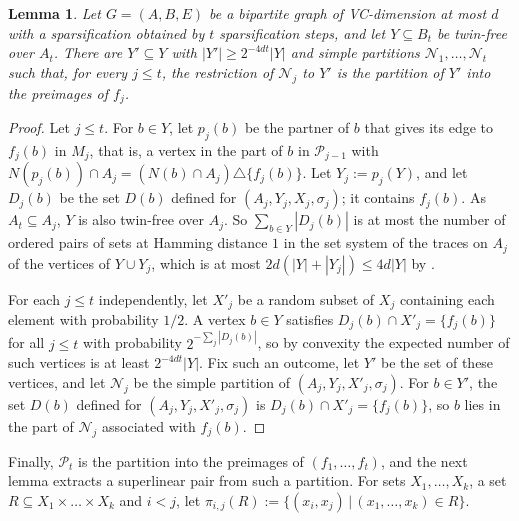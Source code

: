 \documentclass[11pt]{article}
\newtheorem{lemma}[theorem]{Lemma}
\theoremstyle{definition}
\renewcommand{\le}{\leqslant}
\renewcommand{\ge}{\geqslant}
\newcommand{\set}[1]{\{#1\}}
\newcommand{\setof}[2]{\set{#1 \,|\, #2 }}
\newcommand{\Pp}{\mathcal{P}}
\begin{document}
\begin{lemma}\label{lem:flatten}
Let $G = (A, B, E)$ be a bipartite graph of VC-dimension at most $d$ with a sparsification obtained by $t$ sparsification steps, and let $Y \subseteq B_t$ be twin-free over $A_t$.
There are $Y' \subseteq Y$ with $|Y'| \ge 2^{-4dt}|Y|$ and simple partitions $\mathcal N_1, \dots, \mathcal N_t$ such that, for every $j \le t$, the restriction of $\mathcal N_j$ to $Y'$ is the partition of $Y'$ into the preimages of $f_j$.
\end{lemma}
\begin{proof}
Let $j \le t$.
For $b \in Y$, let $p_j(b)$ be the partner of $b$ that gives its edge to $f_j(b)$ in $M_j$, that is, a vertex in the part of $b$ in $\Pp_{j-1}$ with $N(p_j(b)) \cap A_j = (N(b) \cap A_j) \triangle \set{f_j(b)}$.
Let $Y_j := p_j(Y)$, and let $D_j(b)$ be the set $D(b)$ defined for $(A_j, Y_j, X_j, \sigma_j)$; it contains $f_j(b)$.
As $A_t \subseteq A_j$, $Y$ is also twin-free over $A_j$.
So $\sum_{b \in Y} |D_j(b)|$ is at most the number of ordered pairs of sets at Hamming distance $1$ in the set system of the traces on $A_j$ of the vertices of $Y \cup Y_j$, which is at most $2d(|Y| + |Y_j|) \le 4d|Y|$ by .

For each $j \le t$ independently, let $X'_j$ be a random subset of $X_j$ containing each element with probability $1/2$.
A vertex $b \in Y$ satisfies $D_j(b) \cap X'_j = \set{f_j(b)}$ for all $j \le t$ with probability $2^{-\sum_j |D_j(b)|}$, so by convexity the expected number of such vertices is at least $2^{-4dt}|Y|$.
Fix such an outcome, let $Y'$ be the set of these vertices, and let $\mathcal N_j$ be the simple partition of $(A_j, Y_j, X'_j, \sigma_j)$.
For $b \in Y'$, the set $D(b)$ defined for $(A_j, Y_j, X'_j, \sigma_j)$ is $D_j(b) \cap X'_j = \set{f_j(b)}$, so $b$ lies in the part of $\mathcal N_j$ associated with $f_j(b)$.
\end{proof}

Finally, $\Pp_t$ is the partition into the preimages of $(f_1, \dots, f_t)$, and the next lemma extracts a superlinear pair from such a partition.
For sets $X_1, \dots, X_k$, a set $R \subseteq X_1 \times \dots \times X_k$ and $i < j$, let $\pi_{i,j}(R) := \setof{(x_i, x_j)}{(x_1, \dots, x_k) \in R}$.
\end{document}
